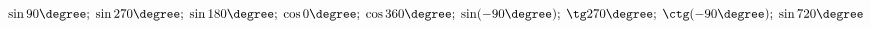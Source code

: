 \begin{ex}[type=calculate]
	\begin{condition}
		\( \sin90\degree;\;\sin270\degree;\;\sin180\degree;\;\cos0\degree;\;\cos360\degree;\;\sin(-90\degree);\;\tg270\degree;\;\ctg(-90\degree);\;\sin720\degree \)
	\end{condition}
\end{ex}
